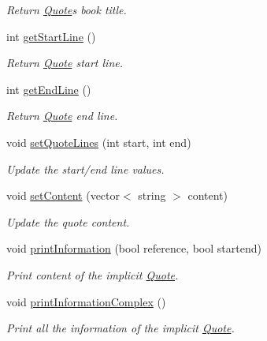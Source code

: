 \begin{DoxyCompactItemize}
\begin{DoxyCompactList}\small\item\em Return \hyperlink{class_quote}{Quote}\textquotesingle{}s book title. \end{DoxyCompactList}\item 
int \hyperlink{class_quote_aa6f56a06332e13b6ee7b4261b8c69372}{get\+Start\+Line} ()
\begin{DoxyCompactList}\small\item\em Return \hyperlink{class_quote}{Quote} start line. \end{DoxyCompactList}\item 
int \hyperlink{class_quote_a145fbd53371ddcca8c63aee0feb7c2c9}{get\+End\+Line} ()
\begin{DoxyCompactList}\small\item\em Return \hyperlink{class_quote}{Quote} end line. \end{DoxyCompactList}\item 
void \hyperlink{class_quote_a211e2593b1ef18dc7fd4a5da87384fa1}{set\+Quote\+Lines} (int start, int end)
\begin{DoxyCompactList}\small\item\em Update the start/end line values. \end{DoxyCompactList}\item 
void \hyperlink{class_quote_ab3af36f8b5649b115fca7eecbb294a59}{set\+Content} (vector$<$ string $>$ content)
\begin{DoxyCompactList}\small\item\em Update the quote content. \end{DoxyCompactList}\item 
void \hyperlink{class_quote_a0854af3d11ff805991e87ef6e9bebf69}{print\+Information} (bool reference, bool startend)
\begin{DoxyCompactList}\small\item\em Print content of the implicit \hyperlink{class_quote}{Quote}. \end{DoxyCompactList}\item 
void \hyperlink{class_quote_ae6847b50fefd892540617426a832a1cf}{print\+Information\+Complex} ()
\begin{DoxyCompactList}\small\item\em Print all the information of the implicit \hyperlink{class_quote}{Quote}. \end{DoxyCompactList}\end{DoxyCompactItemize}
